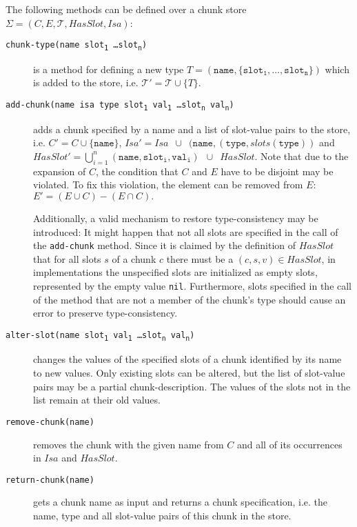 \begin{definition}
\label{def:abstract_methods_chunk_store}
The following methods can be defined over a chunk store $\Sigma = (C, E, \mathcal{T}, HasSlot, Isa)$:

\begin{description}
 \item[\texttt{chunk-type(name slot\textsubscript{1} \dots slot\textsubscript{n})}] is a method for defining a new type $T = (\mathtt{name},\{\mathtt{slot_1}, \dots, \mathtt{slot_n}\})$ which is added to the store, i.e. $\mathcal{T'} = \mathcal{T} \cup \{T\}$. 
 \item[\texttt{add-chunk(name isa type slot\textsubscript{1} val\textsubscript{1} \dots slot\textsubscript{n} val\textsubscript{n})}] adds a chunk specified by a name and a list of slot-value pairs to the store, i.e. $C' = C \cup \{ \mathtt{name} \}$, $Isa' = Isa \enspace \cup \enspace (\mathtt{name}, (\mathtt{type}, slots(\mathtt{type}))$ and $HasSlot' = \bigcup_{i = 1}^n{\mathtt{(name,slot_i,val_i)}} \enspace \cup \enspace HasSlot.$ Note that due to the expansion of $C$, the condition that $C$ and $E$ have to be disjoint may be violated. To fix this violation, the element can be removed from $E$: $E' = (E \cup C) - (E \cap C).$ 
 
 Additionally, a valid mechanism to restore type-consistency may be introduced: It might happen that not all slots are specified in the call of the \lstinline|add-chunk| method. Since it is claimed by the definition of $HasSlot$ that for all slots $s$ of a chunk $c$ there must be a $(c,s,v) \in HasSlot$, in implementations the unspecified slots are initialized as empty slots, represented by the empty value \lstinline|nil|. Furthermore, slots specified in the call of the method that are not a member of the chunk's type should cause an error to preserve type-consistency.
  \item[\texttt{alter-slot(name slot\textsubscript{1} val\textsubscript{1} \dots slot\textsubscript{n} val\textsubscript{n})}] changes the values of the specified slots of a chunk identified by its name to new values. Only existing slots can be altered, but the list of slot-value pairs may be a partial chunk-description. The values of the slots not in the list remain at their old values.
  \item[\texttt{remove-chunk(name)}] removes the chunk with the given name from $C$ and all of its occurrences in $Isa$ and $HasSlot$.
  \item[\texttt{return-chunk(name)}] gets a chunk name as input and returns a chunk specification, i.e. the name, type and all slot-value pairs of this chunk in the store.
\end{description} 
\end{definition}

